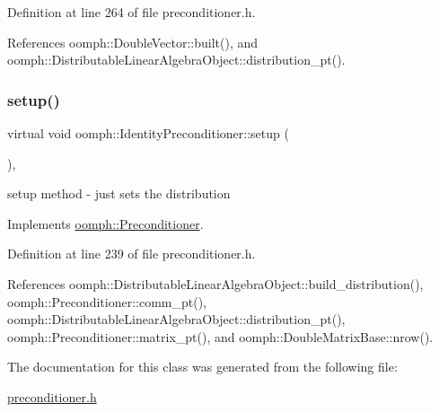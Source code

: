 Definition at line 264 of file preconditioner.\+h.



References oomph\+::\+Double\+Vector\+::built(), and oomph\+::\+Distributable\+Linear\+Algebra\+Object\+::distribution\+\_\+pt().

\mbox{\label{classoomph_1_1IdentityPreconditioner_a7a747d5499c2b04a9ecedcf97d41ede8}} 
\subsubsection{\texorpdfstring{setup()}{setup()}}
{\footnotesize\ttfamily virtual void oomph\+::\+Identity\+Preconditioner\+::setup (\begin{DoxyParamCaption}{ }\end{DoxyParamCaption})\hspace{0.3cm}{\ttfamily [inline]}, {\ttfamily [virtual]}}



setup method -\/ just sets the distribution 



Implements \hyperlink{classoomph_1_1Preconditioner_af4886f4efe510e5c9b0eb19422943588}{oomph\+::\+Preconditioner}.



Definition at line 239 of file preconditioner.\+h.



References oomph\+::\+Distributable\+Linear\+Algebra\+Object\+::build\+\_\+distribution(), oomph\+::\+Preconditioner\+::comm\+\_\+pt(), oomph\+::\+Distributable\+Linear\+Algebra\+Object\+::distribution\+\_\+pt(), oomph\+::\+Preconditioner\+::matrix\+\_\+pt(), and oomph\+::\+Double\+Matrix\+Base\+::nrow().



The documentation for this class was generated from the following file\+:\begin{DoxyCompactItemize}
\item 
\hyperlink{preconditioner_8h}{preconditioner.\+h}\end{DoxyCompactItemize}
